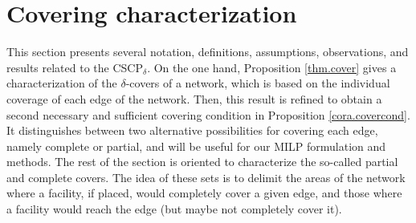 \documentclass[review]{elsarticle}
\newcommand{\dlt}{{\delta}}
\newcommand{\problem}{CSCP$_\dlt$}
\theoremstyle{definition}
\begin{document}
\section{Covering characterization}\label{sec:prelim}
This section presents several notation, definitions, assumptions, observations, and results related to the \problem. On the one hand, Proposition \ref{thm.cover} gives a characterization of the $\dlt$-covers of a network, which is based on the individual coverage of each edge of the network. Then, this result is refined to obtain a second necessary and sufficient covering condition in Proposition \ref{cora.covercond}. It distinguishes between two alternative possibilities for covering each edge, namely complete or partial, and will be useful for our MILP formulation and methods. The rest of the section is oriented to characterize the so-called partial and complete covers. The idea of these sets is to delimit the areas of the network where a facility, if placed, would completely cover a given edge, and those where a facility would reach the edge (but maybe not completely cover it).
\end{document}
